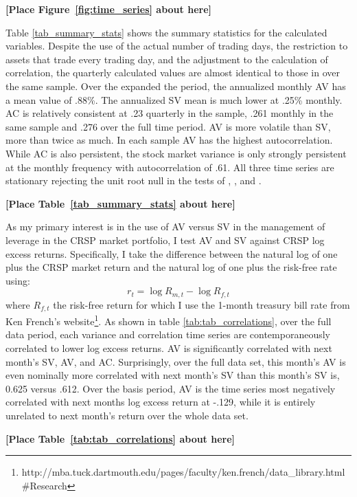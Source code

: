\bigskip
\centerline{\bf [Place Figure~\ref{fig:time_series} about here]}
\bigskip
Table \ref{tab_summary_stats} shows the summary statistics for the calculated variables. Despite the use of the actual number of trading days, the restriction to assets that trade every trading day, and the adjustment to the calculation of correlation, the quarterly calculated values are almost identical to those in \citet{pollet_average_2010} over the same sample. Over the expanded the period, the annualized monthly AV has a mean value of .88\%. The annualized SV mean is much lower at .25\% monthly. AC is relatively consistent at .23 quarterly in the \cite{pollet_average_2010} sample, .261 monthly in the same sample and .276 over the full time period. AV is more volatile than SV, more than twice as much. In each sample AV has the highest autocorrelation. While AC is also persistent, the stock market variance is only strongly persistent at the monthly frequency with autocorrelation of .61. All three time series are stationary rejecting the unit root null in the tests of \citet{dickey_distribution_1979}, \citet{Ng2001}, and \citet{ers1996}.
\bigskip
\centerline{\bf [Place Table~\ref{tab_summary_stats} about here]}
\bigskip
As my primary interest is in the use of AV versus SV in the management of leverage in the CRSP market portfolio, I test AV and SV against CRSP log excess returns.
Specifically, I take the difference between the natural log of one plus the CRSP market return and the natural log of one plus the risk-free rate using:
\begin{equation}
	r_{t} = \log R_{m,t} - \log R_{f,t} 
\end{equation}
where $R_{f,t}$ the risk-free return for which I use the 1-month treasury bill rate from Ken French's website\footnote{http://mba.tuck.dartmouth.edu/pages/faculty/ken.french/data\_library.html\#Research}. As shown in table \ref{tab:tab_correlations}, over the full data period, each variance and correlation time series are contemporaneously correlated to lower log excess returns. AV is significantly correlated with next month's SV, AV, and AC. Surprisingly, over the full data set, this month's AV is even nominally more correlated with next month's SV than this month's SV is, 0.625 versus .612. Over the basis period, AV is the time series most negatively correlated with next months log excess return at -.129, while it is entirely unrelated to next month's return over the whole data set.
\bigskip
\centerline{\bf [Place Table~\ref{tab:tab_correlations} about here]}
\bigskip

